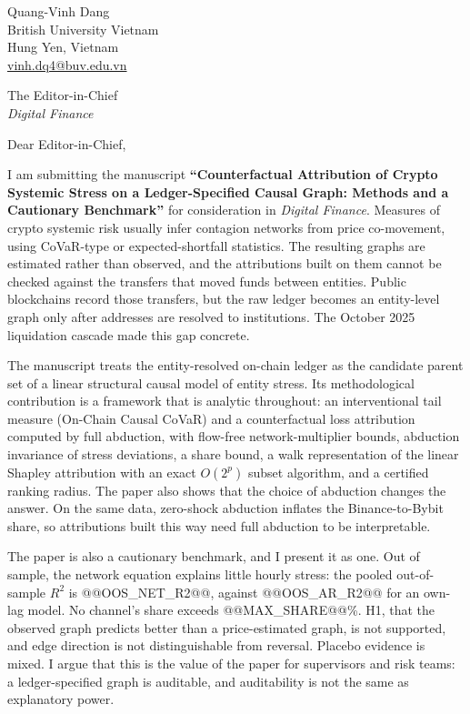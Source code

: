 \documentclass[11pt]{article}
\begin{document}
\vspace{1em}
\noindent Quang-Vinh Dang\\
British University Vietnam\\
Hung Yen, Vietnam\\
\href{mailto:vinh.dq4@buv.edu.vn}{vinh.dq4@buv.edu.vn}

\vspace{1em}
\noindent The Editor-in-Chief\\
\emph{Digital Finance}

\vspace{1em}
\noindent Dear Editor-in-Chief,

\vspace{0.5em}
I am submitting the manuscript \textbf{``Counterfactual Attribution of Crypto
Systemic Stress on a Ledger-Specified Causal Graph: Methods and a Cautionary
Benchmark''} for consideration in \emph{Digital Finance}. Measures of crypto
systemic risk usually infer contagion networks from price co-movement, using
CoVaR-type or expected-shortfall statistics. The resulting graphs are estimated
rather than observed, and the attributions built on them cannot be checked
against the transfers that moved funds between entities. Public blockchains
record those transfers, but the raw ledger becomes an entity-level graph only
after addresses are resolved to institutions. The October 2025 liquidation
cascade made this gap concrete.

The manuscript treats the entity-resolved on-chain ledger as the candidate parent
set of a linear structural causal model of entity stress. Its methodological
contribution is a framework that is analytic throughout: an interventional tail
measure (On-Chain Causal CoVaR) and a counterfactual loss attribution computed by
full abduction, with flow-free network-multiplier bounds, abduction invariance of
stress deviations, a share bound, a walk representation of the linear Shapley
attribution with an exact $O(2^p)$ subset algorithm, and a certified ranking
radius. The paper also shows that the choice of abduction changes the answer. On
the same data, zero-shock abduction inflates the Binance-to-Bybit share, so
attributions built this way need full abduction to be interpretable.

The paper is also a cautionary benchmark, and I present it as one. Out of
sample, the network equation explains little hourly stress: the pooled
out-of-sample $R^2$ is @@OOS_NET_R2@@, against @@OOS_AR_R2@@ for an own-lag model.
No channel's share exceeds @@MAX_SHARE@@\%. H1, that the observed graph predicts
better than a price-estimated graph, is not supported, and edge direction is not
distinguishable from reversal. Placebo evidence is mixed. I argue that this is
the value of the paper for supervisors and risk teams: a ledger-specified graph
is auditable, and auditability is not the same as explanatory power.
\end{document}
